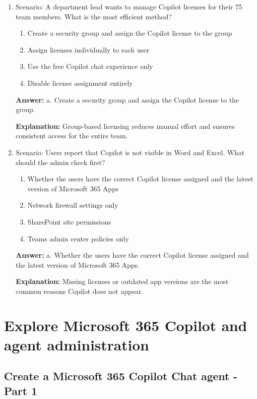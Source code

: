 \documentclass[10pt]{article}
\begin{document}
\begin{enumerate}[leftmargin=*]
\textbf{Explanation:} This role allows password resets while preventing access to sensitive billing data or tenant-wide changes.

\item Scenario: A department lead wants to manage Copilot licenses for their 75 team members. What is the most efficient method?
\begin{enumerate}[label=\alph*., leftmargin=1.5em]
\item Create a security group and assign the Copilot license to the group
\item Assign licenses individually to each user
\item Use the free Copilot chat experience only
\item Disable license assignment entirely
\end{enumerate}
\textbf{Answer:} a. Create a security group and assign the Copilot license to the group.

\textbf{Explanation:} Group-based licensing reduces manual effort and ensures consistent access for the entire team.

\item Scenario: Users report that Copilot is not visible in Word and Excel. What should the admin check first?
\begin{enumerate}[label=\alph*., leftmargin=1.5em]
\item Whether the users have the correct Copilot license assigned and the latest version of Microsoft 365 Apps
\item Network firewall settings only
\item SharePoint site permissions
\item Teams admin center policies only
\end{enumerate}
\textbf{Answer:} a. Whether the users have the correct Copilot license assigned and the latest version of Microsoft 365 Apps.

\textbf{Explanation:} Missing licenses or outdated app versions are the most common reasons Copilot does not appear.

\end{enumerate}
\clearpage
\section{Explore Microsoft 365 Copilot and agent administration}
\clearpage
\subsection{Create a Microsoft 365 Copilot Chat agent - Part 1}
\end{document}
